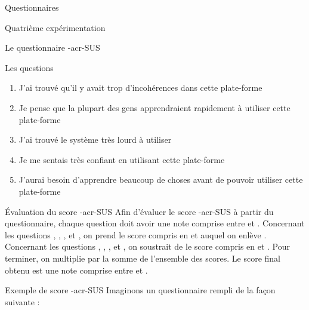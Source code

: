 \documentclass[myfrancais,ngerman,english,frenchb]{mythesis}
\begin{document}
\begin{mychapter}{Questionnaires}
\begin{mysection}{Quatrième expérimentation}
\begin{mysubsection}{Le questionnaire \myacronl-{acr-SUS}}
\begin{mysubsubsection}{Les questions}
\begin{enumerate}[label={Q\arabic*.},ref={Q\arabic*}]
						\item J'ai trouvé qu'il y avait trop d'incohérences dans cette plate-forme
						\item Je pense que la plupart des gens apprendraient rapidement à utiliser cette plate-forme
						\item J'ai trouvé le système très lourd à utiliser
						\item Je me sentais très confiant en utilisant cette plate-forme
						\item J'aurai besoin d'apprendre beaucoup de choses avant de pouvoir utiliser cette plate-forme
					\end{enumerate}
				\end{mysubsubsection}
				\begin{mysubsubsection}{Évaluation du score \myacronl-{acr-SUS}}
					Afin d'évaluer le score \myacro-{acr-SUS} à partir du questionnaire, chaque question doit avoir une note comprise entre  et .
					Concernant les questions , , ,  et , on prend le score compris en  et  auquel on enlève .
					Concernant les questions , , ,  et , on soustrait de  le score compris en  et .
					Pour terminer, on multiplie par  la somme de l'ensemble des scores.
					Le score final obtenu est une note comprise entre  et .
				\end{mysubsubsection}
				\begin{mysubsubsection}{Exemple de score \myacronl-{acr-SUS}}
					Imaginons un questionnaire rempli de la façon suivante :
					\newcommand{\mySUSplus}[1]{%
						\fpRegSet{mySUSplus}{1}
						\fpRegSet{myscore}{#1}%
						\fpRegSub{myscore}{mySUSplus}%
						\fpRegRound{myscore}{0}%
						\fpRegGet{myscore}{\myscore}%
						réponse \textcolor{mygreen}{\mynum{#1}} $\Rightarrow$ score $\textcolor{mygreen}{\mynum{#1}} - 1 = \textcolor{myred}{\mynum{\myscore}}$%
					}
					\newcommand{\mySUSminus}[1]{%
						\fpRegSet{mylevel}{5}
						\fpRegSet{myscore}{#1}
						\fpRegSub{mylevel}{myscore}%
						\fpRegRound{mylevel}{0}%
						\fpRegGet{mylevel}{\myscore}%
						réponse \textcolor{mygreen}{\mynum{#1}} $\Rightarrow$ score $5 - \textcolor{mygreen}{\mynum{#1}} = \textcolor{myred}{\mynum{\myscore}}$%
					}
					\begin{enumerate}[label={Q\arabic*.},ref={Q\arabic*}]

\end{enumerate}
\end{mysubsubsection}
\end{mysubsection}
\end{mysection}
\end{mychapter}
\end{document}
